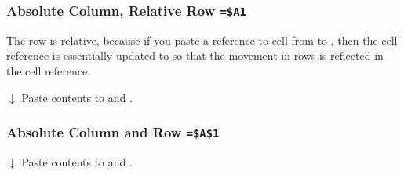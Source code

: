 \subsubsection{Absolute Column, Relative Row \texttt{=\$A1}}


The row is relative, because if you paste a reference to cell  from  to , then the cell reference is essentially updated to  so that the movement in rows is reflected in the cell reference. 


\begin{center}

$\downarrow$ Paste  contents to  and .

\end{center}


\subsubsection{Absolute Column and Row \texttt{=\$A\$1}}

\begin{center}

$\downarrow$ Paste  contents to  and .

\end{center}